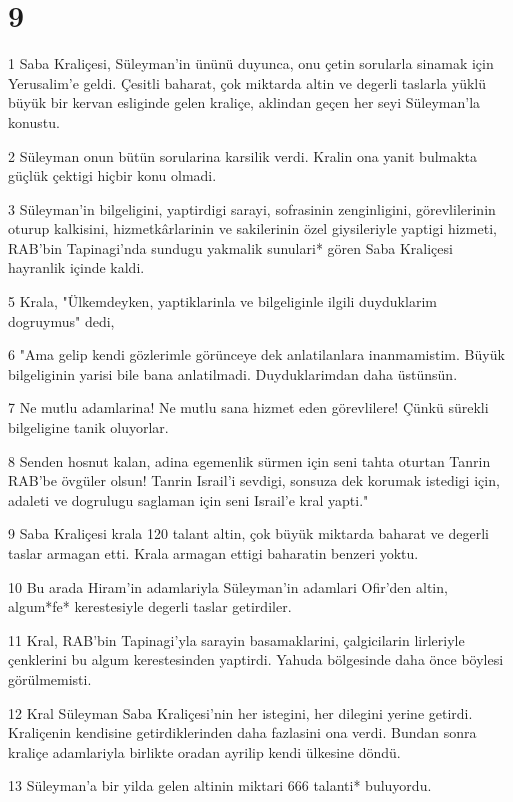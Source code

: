\chapter{9}

\par 1 Saba Kraliçesi, Süleyman'in ününü duyunca, onu çetin sorularla sinamak için Yerusalim'e geldi. Çesitli baharat, çok miktarda altin ve degerli taslarla yüklü büyük bir kervan esliginde gelen kraliçe, aklindan geçen her seyi Süleyman'la konustu.
\par 2 Süleyman onun bütün sorularina karsilik verdi. Kralin ona yanit bulmakta güçlük çektigi hiçbir konu olmadi.
\par 3 Süleyman'in bilgeligini, yaptirdigi sarayi, sofrasinin zenginligini, görevlilerinin oturup kalkisini, hizmetkârlarinin ve sakilerinin özel giysileriyle yaptigi hizmeti, RAB'bin Tapinagi'nda sundugu yakmalik sunulari* gören Saba Kraliçesi hayranlik içinde kaldi.
\par 5 Krala, "Ülkemdeyken, yaptiklarinla ve bilgeliginle ilgili duyduklarim dogruymus" dedi,
\par 6 "Ama gelip kendi gözlerimle görünceye dek anlatilanlara inanmamistim. Büyük bilgeliginin yarisi bile bana anlatilmadi. Duyduklarimdan daha üstünsün.
\par 7 Ne mutlu adamlarina! Ne mutlu sana hizmet eden görevlilere! Çünkü sürekli bilgeligine tanik oluyorlar.
\par 8 Senden hosnut kalan, adina egemenlik sürmen için seni tahta oturtan Tanrin RAB'be övgüler olsun! Tanrin Israil'i sevdigi, sonsuza dek korumak istedigi için, adaleti ve dogrulugu saglaman için seni Israil'e kral yapti."
\par 9 Saba Kraliçesi krala 120 talant altin, çok büyük miktarda baharat ve degerli taslar armagan etti. Krala armagan ettigi baharatin benzeri yoktu.
\par 10 Bu arada Hiram'in adamlariyla Süleyman'in adamlari Ofir'den altin, algum*fe* kerestesiyle degerli taslar getirdiler.
\par 11 Kral, RAB'bin Tapinagi'yla sarayin basamaklarini, çalgicilarin lirleriyle çenklerini bu algum kerestesinden yaptirdi. Yahuda bölgesinde daha önce böylesi görülmemisti.
\par 12 Kral Süleyman Saba Kraliçesi'nin her istegini, her dilegini yerine getirdi. Kraliçenin kendisine getirdiklerinden daha fazlasini ona verdi. Bundan sonra kraliçe adamlariyla birlikte oradan ayrilip kendi ülkesine döndü.
\par 13 Süleyman'a bir yilda gelen altinin miktari 666 talanti* buluyordu.
